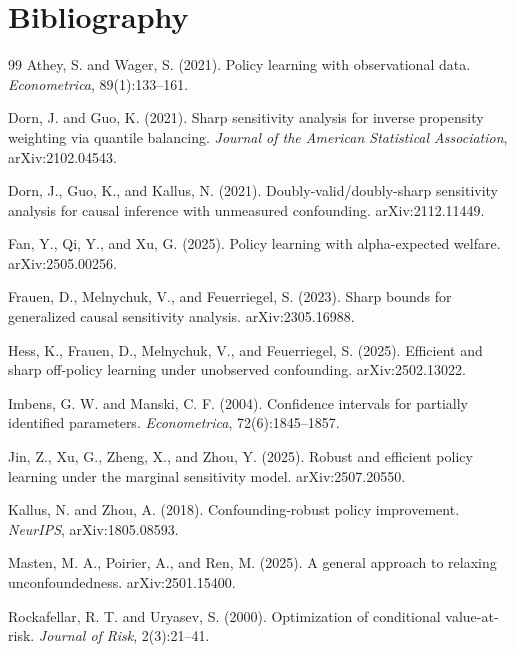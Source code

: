 \documentclass[11pt]{article}
\theoremstyle{definition}
\theoremstyle{plain}
\theoremstyle{remark}
\begin{document}
\section*{Bibliography}
\begin{thebibliography}{99}
Athey, S. and Wager, S. (2021).
\newblock Policy learning with observational data.
\newblock \emph{Econometrica}, 89(1):133--161.

Dorn, J. and Guo, K. (2021).
\newblock Sharp sensitivity analysis for inverse propensity weighting via quantile balancing.
\newblock \emph{Journal of the American Statistical Association}, arXiv:2102.04543.

Dorn, J., Guo, K., and Kallus, N. (2021).
\newblock Doubly-valid/doubly-sharp sensitivity analysis for causal inference with unmeasured confounding.
\newblock arXiv:2112.11449.

Fan, Y., Qi, Y., and Xu, G. (2025).
\newblock Policy learning with alpha-expected welfare.
\newblock arXiv:2505.00256.

Frauen, D., Melnychuk, V., and Feuerriegel, S. (2023).
\newblock Sharp bounds for generalized causal sensitivity analysis.
\newblock arXiv:2305.16988.

Hess, K., Frauen, D., Melnychuk, V., and Feuerriegel, S. (2025).
\newblock Efficient and sharp off-policy learning under unobserved confounding.
\newblock arXiv:2502.13022.

Imbens, G. W. and Manski, C. F. (2004).
\newblock Confidence intervals for partially identified parameters.
\newblock \emph{Econometrica}, 72(6):1845--1857.

Jin, Z., Xu, G., Zheng, X., and Zhou, Y. (2025).
\newblock Robust and efficient policy learning under the marginal sensitivity model.
\newblock arXiv:2507.20550.

Kallus, N. and Zhou, A. (2018).
\newblock Confounding-robust policy improvement.
\newblock \emph{NeurIPS}, arXiv:1805.08593.

Masten, M. A., Poirier, A., and Ren, M. (2025).
\newblock A general approach to relaxing unconfoundedness.
\newblock arXiv:2501.15400.

Rockafellar, R. T. and Uryasev, S. (2000).
\newblock Optimization of conditional value-at-risk.
\newblock \emph{Journal of Risk}, 2(3):21--41.
\end{thebibliography}
\end{document}
